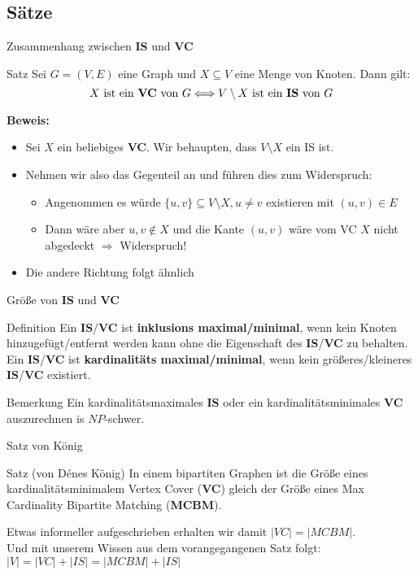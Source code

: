 \subsection{Sätze}
\begin{frame}{Zusammenhang zwischen \textbf{IS} und \textbf{VC}}
	\begin{block}{Satz}
		Sei $G=(V,E)$ eine Graph und $X\subseteq V$ eine Menge von Knoten. Dann gilt:
		\[X\text{ ist ein \textbf{VC} von $G$} \Longleftrightarrow V\setminus X\text{ ist ein \textbf{IS} von $G$}\]
	\end{block}
	\pause
	\textbf{Beweis:}
	\begin{itemize}
		\item Sei $X$ ein beliebiges \textbf{VC}. Wir behaupten, dass $V\setminus X$ ein IS ist.
		\item Nehmen wir also das Gegenteil an und führen dies zum Widerspruch:
		\pause
		\begin{itemize}
			\item Angenommen es würde $\{u,v\}\subseteq V\setminus X, u\neq v$ existieren mit $(u,v)\in E$
			\item Dann wäre aber $u,v\notin X$ und die Kante $(u,v)$ wäre vom VC $X$ nicht abgedeckt $\Rightarrow$ Widerspruch!
		\end{itemize}
		\pause
		\item Die andere Richtung folgt ähnlich
	\end{itemize}
\end{frame}
\begin{frame}{Größe von \textbf{IS} und \textbf{VC}}
	\begin{block}{Definition}
		Ein \textbf{IS}/\textbf{VC} ist \textbf{inklusions maximal/minimal}, wenn kein Knoten hinzugefügt/entfernt werden kann ohne die Eigenschaft des \textbf{IS}/\textbf{VC} zu behalten.\\
		Ein \textbf{IS}/\textbf{VC} ist \textbf{kardinalitäts maximal/minimal}, wenn kein größeres/kleineres \textbf{IS}/\textbf{VC} existiert.
	\end{block}
	\pause
	\begin{block}{Bemerkung}
		Ein kardinalitätsmaximales \textbf{IS} oder ein kardinalitätsminimales \textbf{VC} auszurechnen is $NP$-schwer.
	\end{block}
\end{frame}
\begin{frame}{Satz von König}
	\begin{block}{Satz (von Dénes König)}
		In einem bipartiten Graphen ist die Größe eines kardinalitätsminimalem Vertex Cover (\textbf{VC}) gleich der Größe eines Max Cardinality Bipartite Matching (\textbf{MCBM}).
	\end{block}
	\pause
	Etwas informeller aufgeschrieben erhalten wir damit $|VC| = |MCBM|$.\\
	Und mit unserem Wissen aus dem vorangegangenen Satz folgt: $|V| = |VC| + |IS| = |MCBM| + |IS|$\\
\end{frame}

